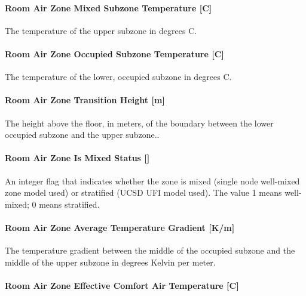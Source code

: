 \paragraph{Room Air Zone Mixed Subzone Temperature {[}C{]}}\label{room-air-zone-mixed-subzone-temperature-c-1}

The temperature of the upper subzone in degrees C.

\paragraph{Room Air Zone Occupied Subzone Temperature {[}C{]}}\label{room-air-zone-occupied-subzone-temperature-c-1}

The temperature of the lower, occupied subzone in degrees C.

\paragraph{Room Air Zone Transition Height {[}m{]}}\label{room-air-zone-transition-height-m-1}

The height above the floor, in meters, of the boundary between the lower occupied subzone and the upper subzone..

\paragraph{Room Air Zone Is Mixed Status {[]}}\label{room-air-zone-is-mixed-status-1}

An integer flag that indicates whether the zone is mixed (single node well-mixed zone model used) or stratified (UCSD UFI model used). The value 1 means well-mixed; 0 means stratified.

\paragraph{Room Air Zone Average Temperature Gradient {[}K/m{]}}\label{room-air-zone-average-temperature-gradient-km-1}

The temperature gradient between the middle of the occupied subzone and the middle of the upper subzone in degrees Kelvin per meter.

\paragraph{Room Air Zone Effective Comfort Air Temperature {[}C{]}}\label{room-air-zone-effective-comfort-air-temperature-c}

